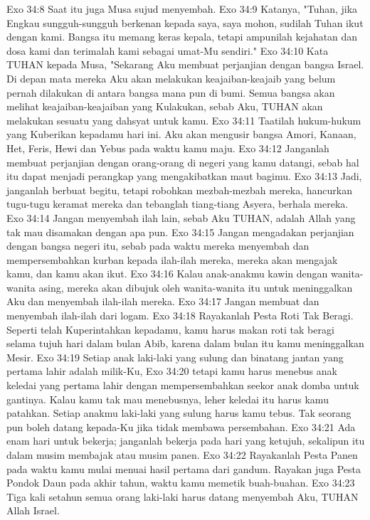 Exo 34:8  Saat itu juga Musa sujud menyembah.
Exo 34:9  Katanya, "Tuhan, jika Engkau sungguh-sungguh berkenan kepada saya, saya mohon, sudilah Tuhan ikut dengan kami. Bangsa itu memang keras kepala, tetapi ampunilah kejahatan dan dosa kami dan terimalah kami sebagai umat-Mu sendiri."
Exo 34:10  Kata TUHAN kepada Musa, "Sekarang Aku membuat perjanjian dengan bangsa Israel. Di depan mata mereka Aku akan melakukan keajaiban-keajaib yang belum pernah dilakukan di antara bangsa mana pun di bumi. Semua bangsa akan melihat keajaiban-keajaiban yang Kulakukan, sebab Aku, TUHAN akan melakukan sesuatu yang dahsyat untuk kamu.
Exo 34:11  Taatilah hukum-hukum yang Kuberikan kepadamu hari ini. Aku akan mengusir bangsa Amori, Kanaan, Het, Feris, Hewi dan Yebus pada waktu kamu maju.
Exo 34:12  Janganlah membuat perjanjian dengan orang-orang di negeri yang kamu datangi, sebab hal itu dapat menjadi perangkap yang mengakibatkan maut bagimu.
Exo 34:13  Jadi, janganlah berbuat begitu, tetapi robohkan mezbah-mezbah mereka, hancurkan tugu-tugu keramat mereka dan tebanglah tiang-tiang Asyera, berhala mereka.
Exo 34:14  Jangan menyembah ilah lain, sebab Aku TUHAN, adalah Allah yang tak mau disamakan dengan apa pun.
Exo 34:15  Jangan mengadakan perjanjian dengan bangsa negeri itu, sebab pada waktu mereka menyembah dan mempersembahkan kurban kepada ilah-ilah mereka, mereka akan mengajak kamu, dan kamu akan ikut.
Exo 34:16  Kalau anak-anakmu kawin dengan wanita-wanita asing, mereka akan dibujuk oleh wanita-wanita itu untuk meninggalkan Aku dan menyembah ilah-ilah mereka.
Exo 34:17  Jangan membuat dan menyembah ilah-ilah dari logam.
Exo 34:18  Rayakanlah Pesta Roti Tak Beragi. Seperti telah Kuperintahkan kepadamu, kamu harus makan roti tak beragi selama tujuh hari dalam bulan Abib, karena dalam bulan itu kamu meninggalkan Mesir.
Exo 34:19  Setiap anak laki-laki yang sulung dan binatang jantan yang pertama lahir adalah milik-Ku,
Exo 34:20  tetapi kamu harus menebus anak keledai yang pertama lahir dengan mempersembahkan seekor anak domba untuk gantinya. Kalau kamu tak mau menebusnya, leher keledai itu harus kamu patahkan. Setiap anakmu laki-laki yang sulung harus kamu tebus. Tak seorang pun boleh datang kepada-Ku jika tidak membawa persembahan.
Exo 34:21  Ada enam hari untuk bekerja; janganlah bekerja pada hari yang ketujuh, sekalipun itu dalam musim membajak atau musim panen.
Exo 34:22  Rayakanlah Pesta Panen pada waktu kamu mulai menuai hasil pertama dari gandum. Rayakan juga Pesta Pondok Daun pada akhir tahun, waktu kamu memetik buah-buahan.
Exo 34:23  Tiga kali setahun semua orang laki-laki harus datang menyembah Aku, TUHAN Allah Israel.
